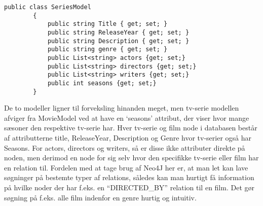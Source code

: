 \begin{tcolorbox}
    \lstset{style=sharpstyle}
    \begin{lstlisting}[language={[Sharp]C}, caption={Logs HBASE Model}, label={lst:log}]
        public class SeriesModel
        {
            public string Title { get; set; }
            public string ReleaseYear { get; set; }
            public string Description { get; set; }
            public string genre { get; set; }
            public List<string> actors {get; set;}
            public List<string> directors {get; set;}
            public List<string> writers {get; set;}
            public int seasons {get; set;}
        }
    \end{lstlisting}
\end{tcolorbox}
De to modeller ligner til forveksling hinanden meget, men tv-serie modellen afviger fra MovieModel ved at have en ‘seasons’ attribut, der viser hvor mange sæsoner den respektive tv-serie har.
Hver tv-serie og film node i databasen består af attributterne title, ReleaseYear, Description og Genre hvor tv-serier også har Seasons. For actors, directors og writers, så er disse ikke attributer direkte på noden, men derimod en node for sig selv hvor den specifikke tv-serie eller film har en relation til.
Fordelen med at tage brug af Neo4J her er, at man let kan lave søgninger på bestemte typer af relations, således kan man hurtigt få information på hvilke noder der har f.eks. en “DIRECTED\_BY” relation til en film. Det gør søgning på f.eks. alle film indenfor en genre hurtig og intuitiv.